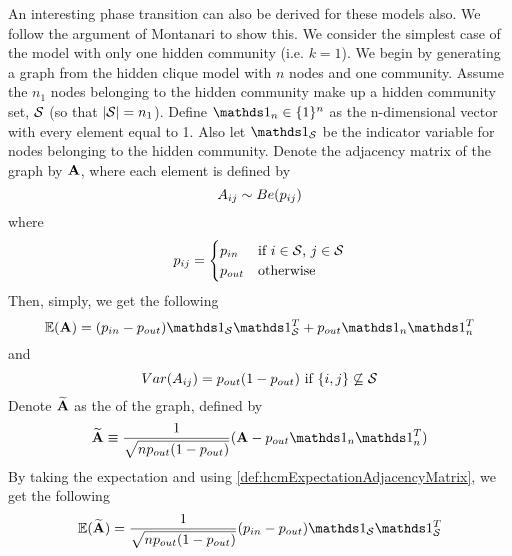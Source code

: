 An interesting phase transition can also be derived for these models also. We follow the argument of Montanari \cite{DM13,Mon13} to show this. We consider the simplest case of the model with only one hidden community (i.e. $k = 1$).
We begin by generating a graph from the hidden clique model with $n$ nodes and one community.
Assume the $n_{1}$ nodes belonging to the hidden community make up a hidden community set, $\mathcal S$ (so that $\left\vert\mathcal S\right\vert = n_{1}$). Define $\one_{n} \in \{1\}^{n}$ as the n-dimensional vector with every element equal to 1.
Also let $\one_{\setvar{S}}$ be the indicator variable for nodes belonging to the hidden community.
Denote the adjacency matrix of the graph by $\mathbf A$, where each element is defined by
\begin{equation}
	\label{def:hcmAdjacencyMatrix}
	A_{ij} \sim Be(p_{ij})
\end{equation}
where 
\begin{equation}
	\label{def:hcmPijAdjacencyMatrix}
	p_{ij} =	
	\begin{cases}
		p_{in} & \text{if } i \in \mathcal S \text{, } j \in \mathcal S \\
		p_{out} & \text{otherwise}
	\end{cases}
\end{equation}
Then, simply, we get the following
\begin{equation}
	\label{def:hcmExpectationAdjacencyMatrix}
	\expectation{\matvar{A}} = (p_{in} - p_{out})\one_{\setvar{S}}\transpose{\one_{\setvar{S}}} + p_{out}\one_{n}\transpose{\one_{n}}
\end{equation}
and
\begin{equation}
	\label{def:hcmVarianceAdjacencyMatrix}
	Var(A_{ij}) = p_{out}(1-p_{out}) \text{ if } \{i,j\} \not\subseteq \mathcal S
\end{equation}
Denote $\widetilde{\mathbf A}$ as the  of the graph, defined by
\begin{equation}
	\label{def:hcmNormlaisedAdjacencyMatrix}
	\widetilde{\matvar{A}} \equiv \frac{1}{\sqrt{np_{out}(1-p_{out})}} (\matvar{A} - p_{out}\one_{n}\transpose{\one_{n}})
\end{equation}
By taking the expectation and using \cref{def:hcmExpectationAdjacencyMatrix}, we get the following
\begin{equation}
	\label{def:hcmExpectationNormalisedAdjacencyMatrix}
	\expectation{\widetilde{\matvar{A}}} = \frac{1}{\sqrt{np_{out}(1-p_{out})}} (p_{in} - p_{out}) \one_{\setvar{S}}\transpose{\one_{\setvar{S}}}
\end{equation}
